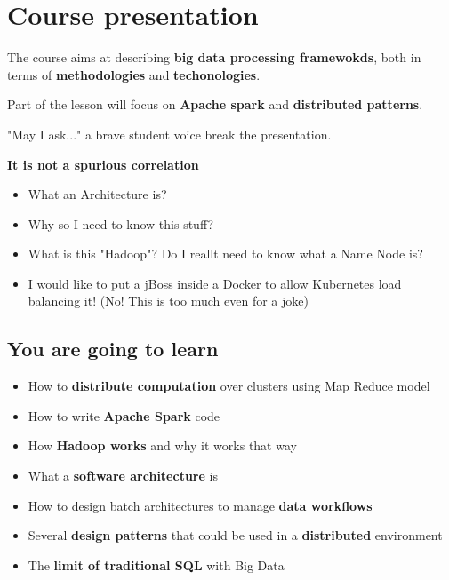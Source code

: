 \section{Course presentation}



The course aims at describing \textbf{big data processing framewokds}, both in terms of \textbf{methodologies} and \textbf{techonologies}.

Part of the lesson will focus on \textbf{Apache spark} and \textbf{distributed patterns}.

"May I ask..." a brave student voice break the presentation.

\textbf{It is not a spurious correlation}
\begin{itemize}
	\item What an Architecture is? 
	\item Why so I need to know this stuff?
	\item What is this "Hadoop"? Do I reallt need to know what a Name Node is?
	\item I would like to put a jBoss inside a Docker to allow Kubernetes load balancing it! (No! This is too much even for a joke)
\end{itemize}

\subsection{You are going to learn}
\begin{itemize}
	\item How to \textbf{distribute computation} over clusters using Map Reduce model
	\item How to write \textbf{Apache Spark} code
	\item How \textbf{Hadoop works} and why it works that way
	\item What a \textbf{software architecture} is
	\item How to design batch architectures to manage \textbf{data workflows}
	\item Several \textbf{design patterns} that could be used in a \textbf{distributed} environment
	\item The \textbf{limit of traditional SQL} with Big Data
\end{itemize}

